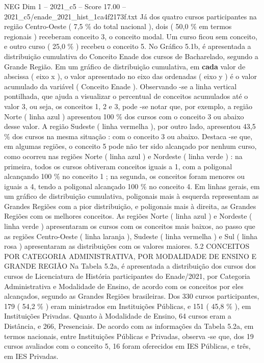 \begin{textsample}{NEG Dim 1 – 2021\_c5 – Score 17.00 – 2021\_c5/enade\_2021\_hist\_1ca4f2173f.txt}
Já dos quatro cursos participantes na região Centro-Oeste ( 7,5 \% do total nacional ), dois ( 50,0 \% em termos regionais ) receberam conceito 3, o conceito modal.
Um curso ficou sem conceito, e outro curso ( 25,0 \% ) recebeu o conceito 5.
No Gráfico 5.1b, é apresentada a distribuição cumulativa do Conceito Enade dos cursos de Bacharelado, segundo a Grande Região.
Em um gráfico de distribuição cumulativa, em \textbf{cada} valor de abscissa ( eixo x ), o valor apresentado no eixo das ordenadas ( eixo y ) é o valor acumulado da variável ( Conceito Enade ).
Observando -se a linha vertical pontilhada, que ajuda a visualizar o percentual de conceitos acumulados até o valor 3, ou seja, os conceitos 1, 2 e 3, pode -se notar que, por exemplo, a região Norte ( linha azul ) apresentou 100 \% dos cursos com o conceito 3 ou abaixo desse valor.
A região Sudeste ( linha vermelha ), por outro lado, apresentou 43,5 \% dos cursos na mesma situação : com o conceito 3 ou abaixo.
Destaca -se que, em algumas regiões, o conceito 5 pode não ter sido alcançado por nenhum curso, como ocorreu nas regiões Norte ( linha azul ) e Nordeste ( linha verde ) : na primeira, todos os cursos obtiveram conceitos iguais a 1, com a poligonal alcançando 100 \% no conceito 1 ; na segunda, os conceitos foram menores ou iguais a 4, tendo a poligonal alcançado 100 \% no conceito 4.
Em linhas gerais, em um gráfico de distribuição cumulativa, poligonais mais à esquerda representam as Grandes Regiões com a pior distribuição, e poligonais mais à direita, as Grandes Regiões com os melhores conceitos.
As regiões Norte ( linha azul ) e Nordeste ( linha verde ) apresentaram os cursos com os conceitos mais baixos, ao passo que as regiões Centro-Oeste ( linha laranja ), Sudeste ( linha vermelha ) e Sul ( linha rosa ) apresentaram as distribuições com os valores maiores. 5.2 CONCEITOS POR CATEGORIA ADMINISTRATIVA, POR MODALIDADE DE ENSINO E GRANDE REGIÃO Na Tabela 5.2a, é apresentada a distribuição dos cursos dos cursos de Licenciatura de História participantes do Enade/2021, por Categoria Administrativa e Modalidade de Ensino, de acordo com os conceitos por eles alcançados, segundo as Grandes Regiões brasileiras.
Dos 330 cursos participantes, 179 ( 54,2 \% ) eram ministrados em Instituições Públicas, e 151 ( 45,8 \% ), em Instituições Privadas.
Quanto à Modalidade de Ensino, 64 cursos eram a Distância, e 266, Presenciais.
De acordo com as informações da Tabela 5.2a, em termos nacionais, entre Instituições Públicas e Privadas, observa -se que, dos 19 cursos avaliados com o conceito 5, 16 foram oferecidos em IES Públicas, e três, em IES Privadas.

\end{textsample}
